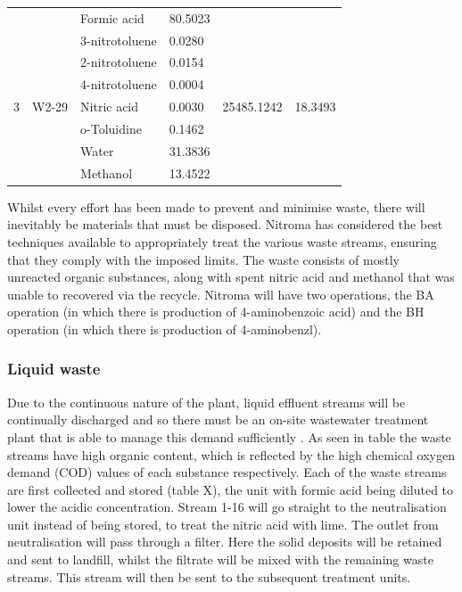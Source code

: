 \begin{table}[]
{\begin{tabular}{@{}llllll@{}}
 &  & Formic acid & 80.5023 &  &  \\
\multirow{7}{*}{3} & \multirow{7}{*}{W2-29} & 3-nitrotoluene & 0.0280 & \multirow{7}{*}{25485.1242} & \multirow{7}{*}{18.3493} \\
 &  & 2-nitrotoluene & 0.0154 &  &  \\
 &  & 4-nitrotoluene & 0.0004 &  &  \\
 &  & Nitric acid & 0.0030 &  &  \\
 &  & o-Toluidine & 0.1462 &  &  \\
 &  & Water & 31.3836 &  &  \\
 &  & Methanol & 13.4522 &  &  \\ \cmidrule(lr){3-4}
\end{tabular}%
}
\end{table}


Whilst every effort has been made to prevent and minimise waste, there will inevitably be materials that must be disposed. Nitroma has considered the best techniques available to appropriately treat the various waste streams, ensuring that they comply with the imposed limits. The waste consists of mostly unreacted organic substances, along with spent nitric acid and methanol that was unable to recovered via the recycle. Nitroma will have two operations, the BA operation (in which there is production of 4-aminobenzoic acid) and the BH operation (in which there is production of 4-aminobenzl). 

\subsubsection{Liquid waste }

Due to the continuous nature of the plant, liquid effluent streams will be continually discharged and so there must be an on-site wastewater treatment plant that is able to manage this demand sufficiently \cite{water_innovations_inc_continuous_2021}.  As seen in table %
the waste streams have high organic content, which is reflected by the high chemical oxygen demand (COD) values of each substance respectively. Each of the waste streams are first collected and stored (table X), the unit with formic acid being diluted to lower the acidic concentration. Stream 1-16 will go straight to the neutralisation unit instead of being stored, to treat the nitric acid with lime. The outlet from neutralisation will pass through a filter. Here the solid deposits will be retained and sent to landfill, whilst the filtrate will be mixed with the remaining waste streams. This stream will then be sent to the subsequent treatment units. 

